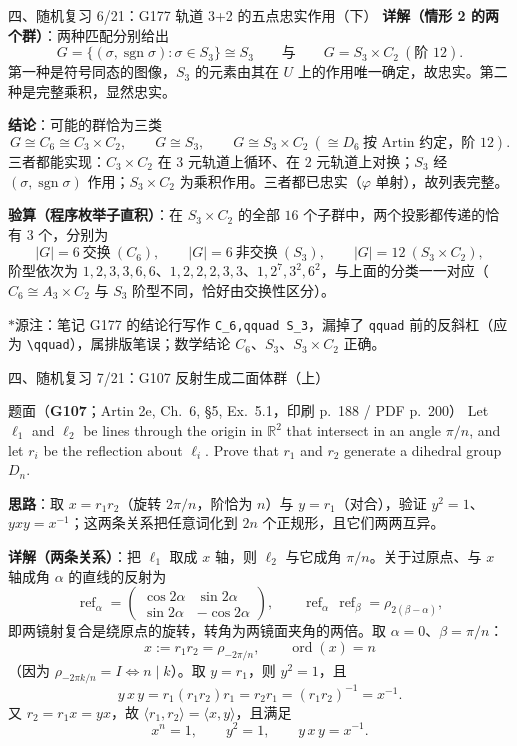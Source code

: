\documentclass[aspectratio=169,10pt,fontset=none]{ctexbeamer}
\newcommand{\ex}[1]{\textcolor{accent}{\footnotesize\bfseries #1}}
\newcommand{\key}[1]{\textcolor{ink}{\bfseries #1}}
\newcommand{\starpt}{\textcolor{accent}{\bfseries$\ast$}}
\begin{document}
\begin{frame}[t]{四、随机复习 6/21：G177 轨道 3+2 的五点忠实作用（下）}
\scriptsize
\key{详解（情形 2 的两个群）}：两种匹配分别给出
\[ G=\{(\sigma,\operatorname{sgn}\sigma):\sigma\in S_3\}\cong S_3\qquad\text{与}\qquad G=S_3\times C_2\ (\text{阶 }12). \]
第一种是符号同态的图像，$S_3$ 的元素由其在 $U$ 上的作用唯一确定，故忠实。第二种是完整乘积，显然忠实。

\key{结论}：可能的群恰为三类
\[ G\cong C_6\cong C_3\times C_2,\qquad G\cong S_3,\qquad G\cong S_3\times C_2\ (\cong D_6\ \text{按 Artin 约定，阶 }12). \]
三者都能实现：$C_3\times C_2$ 在 $3$ 元轨道上循环、在 $2$ 元轨道上对换；$S_3$ 经 $(\sigma,\operatorname{sgn}\sigma)$ 作用；$S_3\times C_2$ 为乘积作用。三者都已忠实（$\varphi$ 单射），故列表完整。

\key{验算（程序枚举子直积）}：在 $S_3\times C_2$ 的全部 $16$ 个子群中，两个投影都传递的恰有 $3$ 个，分别为
\[ |G|=6\ \text{交换}\ (C_6),\qquad |G|=6\ \text{非交换}\ (S_3),\qquad |G|=12\ (S_3\times C_2), \]
阶型依次为 $1,2,3,3,6,6$、$1,2,2,2,3,3$、$1,2^7,3^2,6^2$，与上面的分类一一对应（$C_6\cong A_3\times C_2$ 与 $S_3$ 阶型不同，恰好由交换性区分）。

\starpt 源注：笔记 G177 的结论行写作 \texttt{C\_6,qquad S\_3}，漏掉了 \texttt{qquad} 前的反斜杠（应为 \texttt{\textbackslash qquad}），属排版笔误；数学结论 $C_6$、$S_3$、$S_3\times C_2$ 正确。
\end{frame}

\begin{frame}[t]{四、随机复习 7/21：G107 反射生成二面体群（上）}
\label{ex:G107}
\scriptsize
\begin{block}{\footnotesize 题面（\ex{G107}；Artin 2e, Ch.~6, §5, Ex.~5.1，印刷 p.~188 / PDF p.~200）}
Let $\ell_1$ and $\ell_2$ be lines through the origin in $\mathbb R^2$ that intersect in an angle $\pi/n$, and let $r_i$ be the reflection about $\ell_i$. Prove that $r_1$ and $r_2$ generate a dihedral group $D_n$.
\end{block}
\key{思路}：取 $x=r_1r_2$（旋转 $2\pi/n$，阶恰为 $n$）与 $y=r_1$（对合），验证 $y^2=1$、$yxy=x^{-1}$；这两条关系把任意词化到 $2n$ 个正规形，且它们两两互异。

\key{详解（两条关系）}：把 $\ell_1$ 取成 $x$ 轴，则 $\ell_2$ 与它成角 $\pi/n$。关于过原点、与 $x$ 轴成角 $\alpha$ 的直线的反射为
\[ \operatorname{ref}_\alpha=\begin{pmatrix}\cos2\alpha&\sin2\alpha\\ \sin2\alpha&-\cos2\alpha\end{pmatrix},\qquad \operatorname{ref}_\alpha\,\operatorname{ref}_\beta=\rho_{2(\beta-\alpha)}, \]
即两镜射复合是绕原点的旋转，转角为两镜面夹角的两倍。取 $\alpha=0$、$\beta=\pi/n$：
\[ x:=r_1r_2=\rho_{-2\pi/n},\qquad \operatorname{ord}(x)=n \]
（因为 $\rho_{-2\pi k/n}=I\iff n\mid k$）。取 $y=r_1$，则 $y^2=1$，且
\[ y\,x\,y=r_1(r_1r_2)r_1=r_2r_1=(r_1r_2)^{-1}=x^{-1}. \]
又 $r_2=r_1x=yx$，故 $\langle r_1,r_2\rangle=\langle x,y\rangle$，且满足
\[ x^n=1,\qquad y^2=1,\qquad y\,x\,y=x^{-1}. \]
\end{frame}
\end{document}
